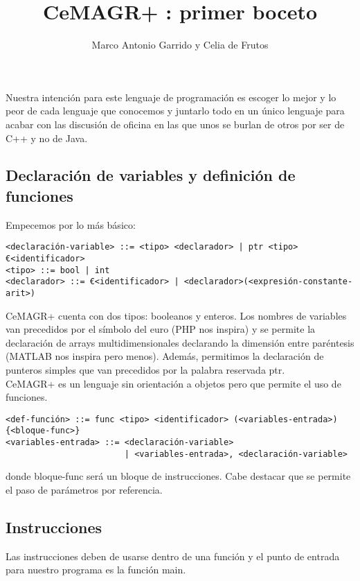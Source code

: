 \documentclass[spanish, a4paper, 12pt] {article}
\newcommand{\lname}[0]{CeMAGR+ }
\begin{document}
\title{\lname: primer boceto}
\author{Marco Antonio Garrido y Celia de Frutos}
\date{}
\maketitle
Nuestra intención para este lenguaje de programación es escoger lo mejor y lo peor de cada lenguaje que conocemos y juntarlo todo en un único lenguaje para acabar con las discusión de oficina en las que unos se burlan de otros por ser de C++ y no de Java.
\subsection*{Declaración de variables y definición de funciones}
Empecemos por lo más básico:
\begin{verbatim}
<declaración-variable> ::= <tipo> <declarador> | ptr <tipo> €<identificador>
<tipo> ::= bool | int
<declarador> ::= €<identificador> | <declarador>(<expresión-constante-arit>)
\end{verbatim}
\lname cuenta con dos tipos: booleanos y enteros. Los nombres de variables van precedidos por el símbolo del euro (PHP nos inspira) y se permite la declaración de arrays multidimensionales declarando la dimensión entre paréntesis (MATLAB nos inspira pero menos). Además, permitimos la declaración de punteros simples que van precedidos por la palabra reservada ptr.\\

\lname es un lenguaje sin orientación a objetos pero que permite el uso de funciones.
\begin{verbatim}
<def-función> ::= func <tipo> <identificador> (<variables-entrada>) {<bloque-func>}
<variables-entrada> ::= <declaración-variable>
                        | <variables-entrada>, <declaración-variable>
\end{verbatim}
donde bloque-func será un bloque de instrucciones. Cabe destacar que se permite el paso de parámetros por referencia.
\subsection*{Instrucciones}
Las instrucciones deben de usarse dentro de una función y el punto de entrada para nuestro programa es la función main.\\
\end{document}

